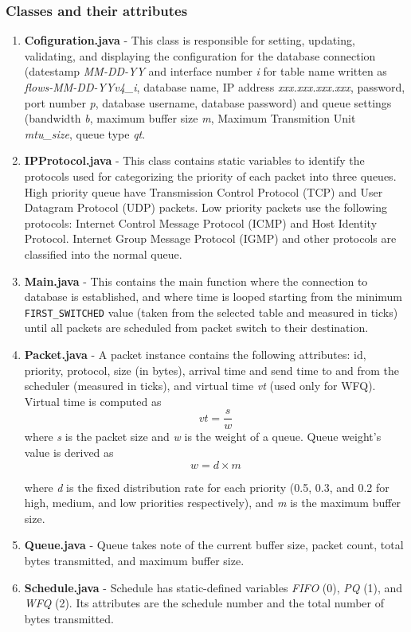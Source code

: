 \documentclass[journal]{IEEE/IEEEtran}
\begin{document}
\subsubsection{Classes and their attributes}
\begin{enumerate}
\item \textbf{Cofiguration.java} - This class is responsible for setting, updating, validating, and displaying the configuration for the database connection (datestamp \textit{MM-DD-YY} and interface number \textit{i} for table name written as \textit{flows-MM-DD-YYv4\_i}, database name, IP address \textit{xxx.xxx.xxx.xxx}, password, port number \textit{p}, database username, database password) and queue settings (bandwidth \textit{b}, maximum buffer size \textit{m}, Maximum Transmition Unit \textit{mtu\_size}, queue type \textit{qt}.

\item \textbf{IPProtocol.java} - This class contains static variables to identify the protocols used for categorizing the priority of each packet into three queues. High priority queue have Transmission Control Protocol (TCP) and User Datagram Protocol (UDP) packets. Low priority packets use the following protocols: Internet Control Message Protocol (ICMP) and Host Identity Protocol. Internet Group Message Protocol (IGMP) and other protocols are classified into the normal queue.

\item \textbf{Main.java} - This contains the main function where the connection to database is established, and where time is looped starting from the minimum \texttt{FIRST\_SWITCHED} value (taken from the selected table and measured in ticks) until all packets are scheduled from packet switch to their destination.

\item \textbf{Packet.java} - A packet instance contains the following attributes: id, priority, protocol, size (in bytes), arrival time and send time to and from the scheduler (measured in ticks), and virtual time \textit{vt} (used only for WFQ).  Virtual time is computed as
\[
    vt = \frac{s}{w}
\]
where \textit{s} is the packet size and \textit{w} is the weight of a queue. Queue weight's value is derived as
\[
	w = d \times m
\]

where \textit{d} is the fixed distribution rate for each priority (0.5, 0.3, and 0.2 for high, medium, and low priorities respectively), and \textit{m} is the maximum buffer size.

\item \textbf{Queue.java} - Queue takes note of the current buffer size, packet count, total bytes transmitted, and maximum buffer size.

\item \textbf{Schedule.java} - Schedule has static-defined variables \textit{FIFO} (0), \textit{PQ} (1), and \textit{WFQ} (2). Its attributes are the schedule number and the total number of bytes transmitted.
\end{enumerate}
\end{document}
